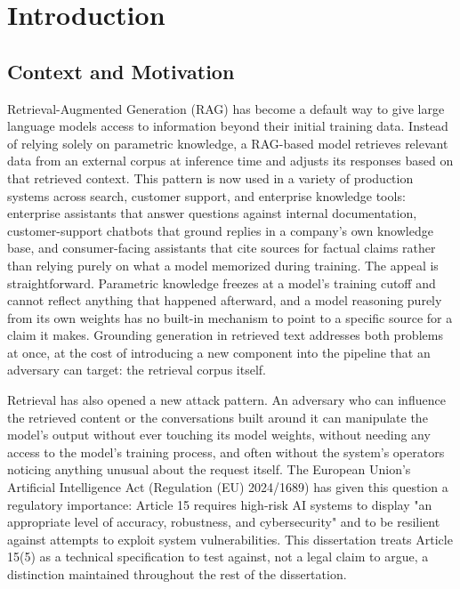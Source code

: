 \chapter{Introduction}

\section{Context and Motivation}

Retrieval-Augmented Generation (RAG) has become a default way to give
large language models access to information beyond their initial
training data. Instead of relying solely on parametric knowledge, a
RAG-based model retrieves relevant data from an external corpus at
inference time and adjusts its responses based on that retrieved
context. This pattern is now used in a variety of production systems
across search, customer support, and enterprise knowledge tools:
enterprise assistants that answer questions against internal
documentation, customer-support chatbots that ground replies in a
company's own knowledge base, and consumer-facing assistants that cite
sources for factual claims rather than relying purely on what a model
memorized during training. The appeal is straightforward. Parametric
knowledge freezes at a model's training cutoff and cannot reflect
anything that happened afterward, and a model reasoning purely from its
own weights has no built-in mechanism to point to a specific source for
a claim it makes. Grounding generation in retrieved text addresses both
problems at once, at the cost of introducing a new component into the
pipeline that an adversary can target: the retrieval corpus itself.

Retrieval has also opened a new attack pattern. An adversary who can
influence the retrieved content or the conversations built around it can
manipulate the model's output without ever touching its model weights,
without needing any access to the model's training process, and often
without the system's operators noticing anything unusual about the
request itself. The European Union's Artificial Intelligence Act
(Regulation (EU) 2024/1689) has given this question a regulatory
importance: Article 15 requires high-risk AI systems to display "an
appropriate level of accuracy, robustness, and cybersecurity" and to be
resilient against attempts to exploit system vulnerabilities. This
dissertation treats Article 15(5) as a technical specification to test
against, not a legal claim to argue, a distinction maintained throughout
the rest of the dissertation.

